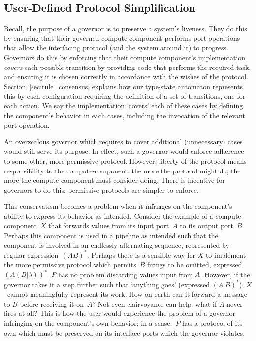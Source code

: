 \subsection{User-Defined Protocol Simplification}
\label{sec:user_defined_simplification}
Recall, the purpose of a governor is to preserve a system's liveness.
They do this by ensuring that their governed compute component performs port operations that allow the interfacing protocol (and the system around it) to progress. 
Governors do this by enforcing that their compute component's implementation \textit{covers} each possible transition by providing code that performs the required task, and ensuring it is chosen correctly in accordance with the wishes of the protocol. Section~\ref{sec:rule_consensus} explains how our type-state automaton represents this by each configuration requiring the definition of a set of transitions, one for each action. We say the implementation `covers' each of these cases by defining the component's behavior in each cases, including the invocation of the relevant port operation.

An overzealous governor which requires to cover additional (unnecessary) cases would still serve its purpose. In effect, such a governor would enforce adherence to some other, more permissive protocol. However, liberty of the protocol means responsibility to the compute-component: the more the protocol might do, the more the compute-component must consider doing. There is incentive for governors to do this: permissive protocols are simpler to enforce.

This conservatism becomes a problem when it infringes on the component's ability to express its behavior as intended. Consider the example of a compute-component~$X$ that forwards values from its input port~$A$ to its output port~$B$. Perhaps this component is used in a pipeline as intended such that the component is involved in an endlessly-alternating sequence, represented by regular expression~$(AB)^*$. Perhaps there is a sensible way for $X$ to implement the more permissive protocol which permits~$B$ firings to be omitted, expressed $(A(B|\lambda{}))^*$. $P$ has no problem discarding values input from $A$. However, if the governor takes it a step further such that `anything goes' (expressed $(A|B)^*$), $X$~cannot meaningfully represent its work. How on earth can it forward a message to $B$ before receiving it on~$A$? Not even clairvoyance can help; what if $A$ never fires at all? This is how the user would experience the problem of a governor infringing on the component's own behavior; in a sense,~$P$ has a protocol of its own which must be preserved on its interface ports which the governor violates.



